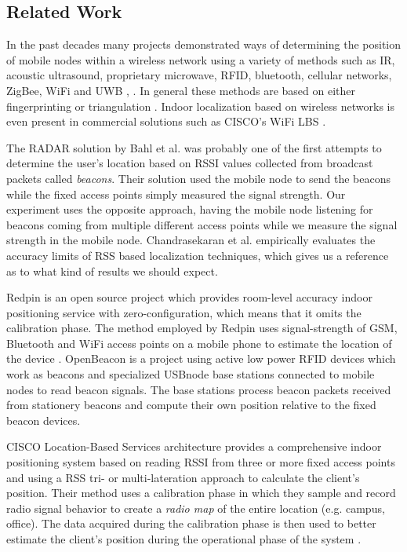 \documentclass[journal]{IEEEtran} 				\IEEEoverridecommandlockouts 						\usepackage{amsmath,amssymb}
\begin{document}
\subsection{Related Work}\label{sec:related}


In the past decades many projects demonstrated ways of determining the position of mobile nodes within a wireless network using a variety of methods such as IR, acoustic ultrasound, proprietary microwave, RFID, bluetooth, cellular networks,  ZigBee, WiFi and UWB \cite{Yang2013}, \cite{Brown2011}. In general these methods are based on either fingerprinting or triangulation \cite{Brown2011}. Indoor localization based on wireless networks is even present in commercial solutions such as CISCO's WiFi LBS \cite{cisco_wifi_lbs}.

The RADAR solution by Bahl et al. \cite{Bahl_Padmanabhan_2000} was probably one of the first attempts to determine the user's location based on RSSI values collected from broadcast packets called \textit{beacons}. Their solution used the mobile node to send the beacons while the fixed access points simply measured the signal strength. Our experiment uses the opposite approach, having the mobile node listening for beacons coming from multiple different access points while we measure the signal strength in the mobile node. Chandrasekaran et al. \cite{ChandrasekaranEYLCGM09} empirically evaluates the accuracy limits of RSS based localization techniques, which gives us a reference as to what kind of results we should expect.

Redpin \cite{redpin} is an open source project which provides room-level accuracy indoor positioning service with zero-configuration, which means that it omits the calibration phase. The method employed by Redpin uses signal-strength of GSM, Bluetooth and WiFi access points on a mobile phone to estimate the location of the device \cite{Bolliger:2008:RAZ:1410012.1410025}. OpenBeacon \cite{openbeacon} is a project using active low power RFID devices which work as beacons and specialized USBnode base stations connected to mobile nodes to read beacon signals. The base stations process beacon packets received from stationery beacons and compute their own position relative to the fixed beacon devices.

CISCO Location-Based Services architecture provides a comprehensive indoor positioning system based on reading RSSI from three or more fixed access points and using a RSS tri- or multi-lateration approach to calculate the client's position. Their method uses a calibration phase in which they sample and record radio signal behavior to create a \textit{radio map} of the entire location (e.g. campus, office). The data acquired during the calibration phase is then used to better estimate the client's position during the operational phase of the system \cite{cisco_wifi_lbs}.
\end{document}
